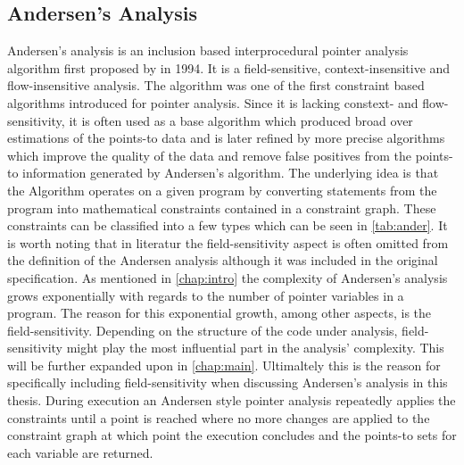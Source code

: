\subsection{Andersen's Analysis}
Andersen's analysis is an inclusion based interprocedural pointer analysis algorithm first proposed by \cite{andersen1994program} in 1994. It is a field-sensitive, context-insensitive and flow-insensitive analysis. 
The algorithm was one of the first constraint based algorithms introduced for pointer analysis. Since it is lacking constext- and flow-sensitivity, it is often used as a base algorithm which produced broad over estimations of the points-to data and is later refined by more precise algorithms which improve the quality of the data and remove false positives from the points-to information generated by Andersen's algorithm.
The underlying idea is that the Algorithm operates on a given program by converting statements from the program into mathematical constraints contained in a constraint graph.
These constraints can be classified into a few types which can be seen in \autoref{tab:ander}.
It is worth noting that in literatur the field-sensitivity aspect is often omitted from the definition of the Andersen analysis although it was included in the original specification.
As mentioned in \autoref{chap:intro} the complexity of Andersen's analysis grows exponentially with regards to the number of pointer variables in a program. The reason for this exponential growth, among other aspects, is the field-sensitivity. Depending on the structure of the code under analysis, field-sensitivity might play the most influential part in the analysis' complexity. This will be further expanded upon in \autoref{chap:main}. Ultimaltely this is the reason for specifically including field-sensitivity when discussing Andersen's analysis in this thesis.
During execution an Andersen style pointer analysis repeatedly applies the constraints until a point is reached where no more changes are applied to the constraint graph at which point the execution concludes and the points-to sets for each variable are returned.
